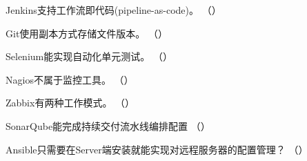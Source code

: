 \begin{problem}
    Jenkins支持工作流即代码(pipeline-as-code)。
    \hfill （）
\end{problem}


\begin{problem}
    Git使用副本方式存储文件版本。
    \hfill （）
\end{problem}


\begin{problem}
    Selenium能实现自动化单元测试。
    \hfill （）
\end{problem}


\begin{problem}
    Nagios不属于监控工具。
    \hfill （）
\end{problem}


\begin{problem}
    Zabbix有两种工作模式。
    \hfill （）
\end{problem}


\begin{problem}
    SonarQube能完成持续交付流水线编排配置
    \hfill （）
\end{problem}



\begin{problem}
    Ansible只需要在Server端安装就能实现对远程服务器的配置管理？
    \hfill （）
\end{problem}
